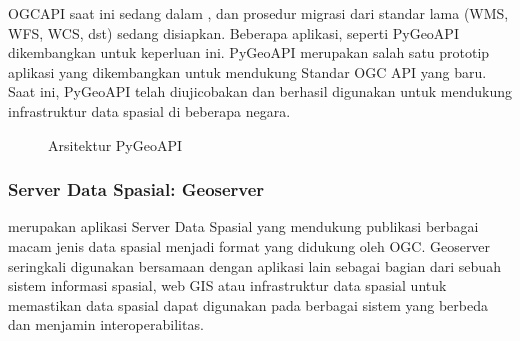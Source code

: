 \documentclass[letterpaper,10pt,english]{sphinxmanual}
\let\sphinxpxdimen\pdfpxdimen\else\newdimen\sphinxpxdimen
\begin{document}
OGC\sphinxhyphen{}API saat ini sedang dalam , dan prosedur migrasi dari standar lama (WMS, WFS, WCS, dst) sedang disiapkan. Beberapa aplikasi, seperti PyGeoAPI dikembangkan untuk keperluan ini. PyGeoAPI merupakan salah satu prototip aplikasi yang dikembangkan untuk mendukung Standar OGC API yang baru. Saat ini, PyGeoAPI telah diujicobakan dan berhasil digunakan untuk mendukung infrastruktur data spasial di beberapa negara.

\begin{figure}[htbp]
\centering
\capstart

\noindent\sphinxincludegraphics[height=300\sphinxpxdimen]{{2020-12-04-03-55-05}.png}
\caption{Arsitektur PyGeoAPI}\label{\detokenize{sesi3/interoperabilitas:pygeoapi}}\end{figure}


\subsubsection{Server Data Spasial: Geoserver}
\label{\detokenize{sesi3/interoperabilitas:server-data-spasial-geoserver}}
 merupakan aplikasi Server Data Spasial yang mendukung publikasi berbagai macam jenis data spasial menjadi format yang didukung oleh OGC. Geoserver seringkali digunakan bersamaan dengan aplikasi lain sebagai bagian dari sebuah sistem informasi spasial, web GIS atau infrastruktur data spasial untuk memastikan data spasial dapat digunakan pada berbagai sistem yang berbeda dan menjamin interoperabilitas.
\end{document}
